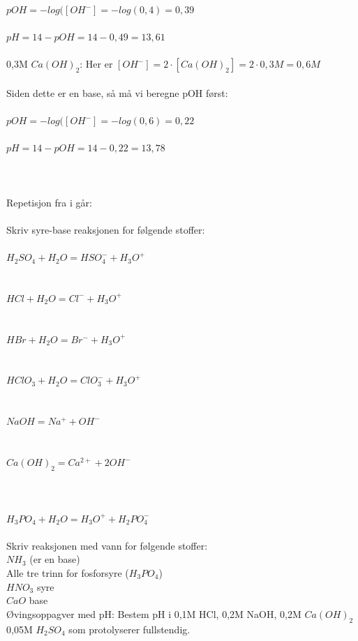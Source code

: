 \documentclass{minmal}
\begin{document}
$pOH=-log([OH^-]=-log(0,4)=0,39$\\\\
$pH=14-pOH=14-0,49=13,61$\\\\
0,3M $Ca(OH)_2$: Her er $[OH^-]=2\cdot[Ca(OH)_2]=2\cdot 0,3M=0,6M$\\\\
Siden dette er en base, så må vi beregne pOH først:\\\\
$pOH=-log([OH^-]=-log(0,6)=0,22$\\\\
$pH=14-pOH=14-0,22=13,78$\\\\
\\\\Repetisjon fra i går:\\\\
Skriv syre-base reaksjonen for følgende stoffer:\\\\
$H_2SO_4+H_2O=HSO_4^-+H_3O^+$\\\\\\
$HCl+H_2O=Cl^-+H_3O^+$\\\\\\
$HBr+H_2O=Br^-+H_3O^+$\\\\\\
$HClO_3+H_2O=ClO_3^-+H_3O^+$\\\\\\
$NaOH=Na^++OH^-$\\\\\\
$Ca(OH)_2=Ca^{2+}+2OH^-$\\\\\\\\
$H_3PO_4+H_2O=H_3O^++H_2PO_4^-$\\\\
Skriv reaksjonen med vann for følgende stoffer:\\
$NH_3$ (er en base)\\
Alle tre trinn for fosforsyre ($H_3PO_4$)\\
$HNO_3$ syre\\
$CaO$ base\\
Øvingsoppagver med pH:
\noindent
Bestem pH i 0,1M HCl, 0,2M NaOH, 0,2M $Ca(OH)_2$ 0,05M $H_2SO_4$ som protolyserer fullstendig. \\
\end{document}

